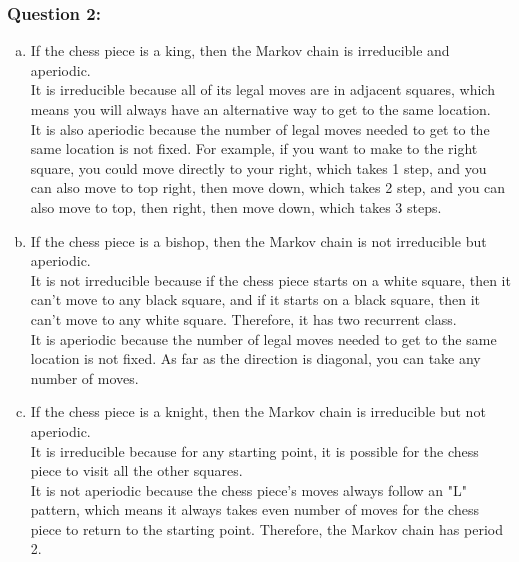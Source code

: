 \documentclass[12pt]{article}
\begin{document}
\subsubsection*{Question 2:} 
\begin{enumerate}[a)]
  \item 
  If the chess piece is a king, then the Markov chain is irreducible and aperiodic.\\
  It is irreducible because all of its legal moves are in adjacent squares, which means you will always have an alternative way to get to the same location.\\
  It is also aperiodic because the number of legal moves needed to get to the same location is not fixed. For example, if you want to make to the right square, you could move directly to your right, which takes 1 step, and you can also move to top right, then move down, which takes 2 step, and you can also move to top, then right, then move down, which takes 3 steps. 
  
  \item 
  If the chess piece is a bishop, then the Markov chain is not irreducible but aperiodic. \\
  It is not irreducible because if the chess piece starts on a white square, then it can't move to any black square, and if it starts on a black square, then it can't move to any white square. Therefore, it has two recurrent class. \\
  It is aperiodic because the number of legal moves needed to get to the same location is not fixed. As far as the direction is diagonal, you can take any number of moves.
    
  \item
  If the chess piece is a knight, then the Markov chain is irreducible but not aperiodic. \\
  It is irreducible because for any starting point, it is possible for the chess piece to visit all the other squares. \\
  It is not aperiodic because the chess piece's moves always follow an "L" pattern, which means it always takes even number of moves for the chess piece to return to the starting point. Therefore, the Markov chain has period 2.
 

\end{enumerate}
\end{document}
